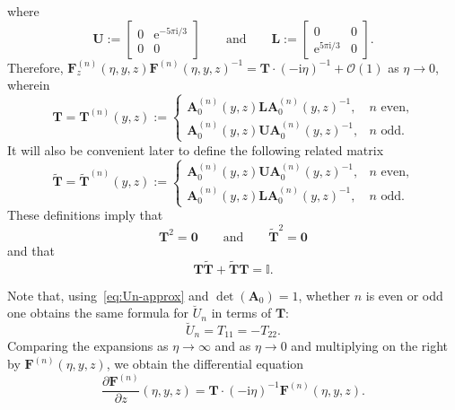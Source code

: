 \documentclass[11pt]{article}
\numberwithin{equation}{section}
\numberwithin{equation}{section}
\begin{document}
 \pagebreak

\noindent
 where
 \begin{equation*}
 \mathbf{U}:=\begin{bmatrix}0&\mathrm{e}^{-5\pi\mathrm{i}/3}\\0&0\end{bmatrix}\qquad\text{and}\qquad\mathbf{L}:=\begin{bmatrix}0&0\\\mathrm{e}^{5\pi\mathrm{i}/3} & 0\end{bmatrix}.
 \end{equation*}
 Therefore, $\mathbf{F}^{(n)}_z(\eta,y,z)\mathbf{F}^{(n)}(\eta,y,z)^{-1}=\mathbf{T}\cdot(-\mathrm{i}\eta)^{-1} + \mathcal{O}(1)$ as $\eta\to 0$, wherein
 \begin{equation}
 \mathbf{T}=\mathbf{T}^{(n)}(y,z):=\begin{cases}\mathbf{A}^{(n)}_0(y,z)\mathbf{L}\mathbf{A}_0^{(n)}(y,z)^{-1},&\text{$n$ even,}\\\mathbf{A}_0^{(n)}(y,z)\mathbf{U}\mathbf{A}_0^{(n)}(y,z)^{-1},&\text{$n$ odd}.\end{cases}
 \label{eq:Z-define}
 \end{equation}
 It will also be convenient later to define the following related matrix
\begin{equation}
\widetilde{\mathbf{T}}=\widetilde{\mathbf{T}}^{(n)}(y,z):=\begin{cases}\mathbf{A}_0^{(n)}(y,z)\mathbf{U}\mathbf{A}_0^{(n)}(y,z)^{-1},&\text{$n$ even,}\\\mathbf{A}_0^{(n)}(y,z)\mathbf{L}\mathbf{A}_0^{(n)}(y,z)^{-1},&\text{$n$ odd}.\end{cases}
 \label{eq:Ztilde-define}
 \end{equation}
 These definitions imply that
 \begin{equation}
\mathbf{T}^2=\mathbf{0}\qquad\text{and}\qquad\widetilde{\mathbf{T}}^2=\mathbf{0}
\label{eq:ZsNilpotent}
\end{equation}
and that
\begin{equation}
\mathbf{T}\widetilde{\mathbf{T}}+\widetilde{\mathbf{T}}\mathbf{T}=\mathbb{I}.
\label{eq:anticommutator}
\end{equation}

 Note that, using~\eqref{eq:Un-approx} and $\det(\mathbf{A}_0)=1$, whether $n$ is even or odd one obtains the same formula for $\breve{U}_n$ in terms of $\mathbf{T}$:
 \begin{equation}
 \breve{U}_n=T_{11}=-T_{22}.
 \label{eq:breveU-Z}
 \end{equation}
 Comparing the expansions as $\eta\to\infty$ and as $\eta\to 0$ and multiplying on the right by $\mathbf{F}^{(n)}(\eta,y,z)$, we obtain the differential equation
 \begin{equation}
 \frac{\partial\mathbf{F}^{(n)}}{\partial z}(\eta,y,z)=\mathbf{T}\cdot(-\mathrm{i}\eta)^{-1}\mathbf{F}^{(n)}(\eta,y,z).
 \label{eq:dFdz}
 \end{equation}
\end{document}
